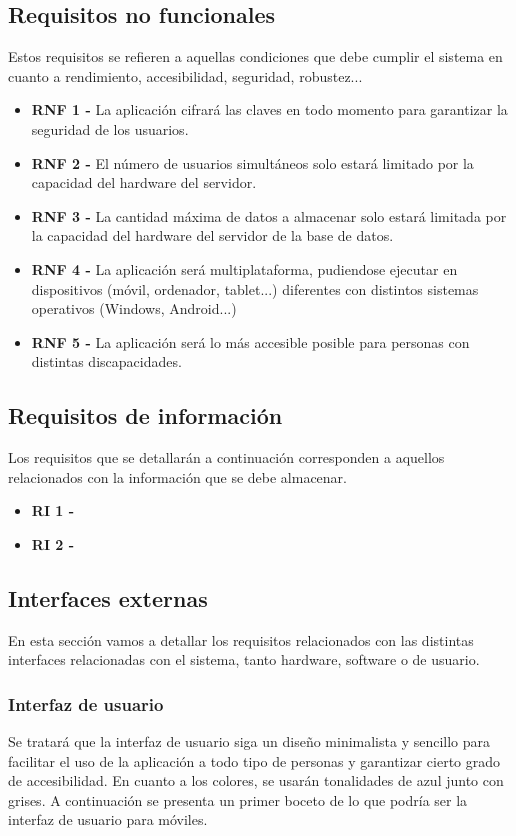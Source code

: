 \subsection{Requisitos no funcionales}
Estos requisitos se refieren a aquellas condiciones que debe cumplir el sistema en cuanto a rendimiento, accesibilidad, seguridad, robustez...
\begin{itemize}
    \item \textbf{RNF 1 - } La aplicación cifrará las claves en todo momento para garantizar la seguridad de los usuarios.
    \item \textbf{RNF 2 - } El número de usuarios simultáneos solo estará limitado por la capacidad del hardware del servidor.
    \item \textbf{RNF 3 - } La cantidad máxima de datos a almacenar solo estará limitada por la capacidad del hardware del servidor de la base de datos.
    \item \textbf{RNF 4 - } La aplicación será multiplataforma, pudiendose ejecutar en dispositivos (móvil, ordenador, tablet...) diferentes con distintos sistemas operativos (Windows, Android...)
    \item \textbf{RNF 5 - } La aplicación será lo más accesible posible para personas con distintas discapacidades. 
\end{itemize}
\subsection{Requisitos de información}
Los requisitos que se detallarán a continuación corresponden a aquellos relacionados con la información que se debe almacenar.
\begin {itemize}
    \item \textbf{RI 1 - }
    \item \textbf{RI 2 - }
\end {itemize}

\subsection{Interfaces externas}
En esta sección vamos a detallar los requisitos relacionados con las distintas interfaces relacionadas con el sistema, 
tanto hardware, software o de usuario.

\subsubsection{Interfaz de usuario}
Se tratará que la interfaz de usuario siga un diseño minimalista y sencillo para facilitar el uso de la aplicación a todo tipo de personas y 
garantizar cierto grado de accesibilidad. En cuanto a los colores, se usarán tonalidades de azul junto con grises.
A continuación se presenta un primer boceto de lo que podría ser la interfaz de usuario para móviles.